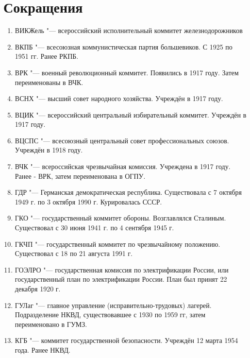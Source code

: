\section{Сокращения}
\begin{enumerate}
    \item ВИКЖель "--- всероссийский исполнительный коммитет железнодорожников \\
    \item ВКПБ "--- всесоюзная коммунистическая партия большевиков. С 1925 по 1951 гг. Ранее РКПБ. \\
    \item ВРК "--- военный революционный коммитет. Появились в 1917 году. Затем переименованы в ВЧК. \\
    \item ВСНХ "--- высший совет народного хозяйства. Учреждён в 1917 году. \\
    \item ВЦИК "--- всероссийский центральный избирательный коммитет. Учреждён в 1917 году. \\
    \item ВЦСПС "--- всесоюзный центральный совет профессиональных союзов. Учреждён в 1918 году. \\
    \item ВЧК "--- всероссийская чрезвычайная комиссия. Учреждена в 1917 году. Ранее - ВРК, затем переименована в ОГПУ. \\
    \item ГДР "--- Германская демократическая республика. Существовала с 7 октября 1949 г. по 3 октября 1990 г. Курировалась СССР. \\
    \item ГКО "--- государственный коммитет обороны. Возглавлялся Сталиным. Существовал с 30 июня 1941 г. по 4 сентября 1945 г. \\
    \item ГКЧП "--- государственный коммитет по чрезвычайному положению. Существовал с 18 по 21 августа 1991 г. \\
    \item ГОЭЛРО "--- государственная комиссия по электрификации России, или государственный план по электрификации России. План был принят 22 декабря 1920 г.  \\
    \item ГУЛаг "--- главное управление (исправительно-трудовых) лагерей. Подразделение НКВД, существовавшее с 1930 по 1959 гг, затем переименовано в ГУМЗ. \\
    \item КГБ "--- коммитет государственной безопасности. Учреждён 12 марта 1954 года. Ранее НКВД. \\

\end{enumerate}
